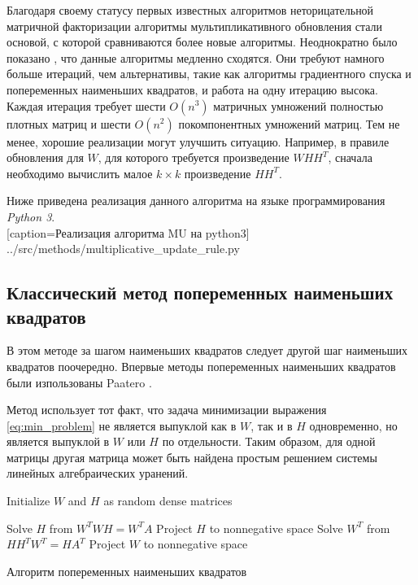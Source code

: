 Благодаря своему статусу первых известных алгоритмов неторицательной матричной факторизации
алгоритмы мультипликативного обновления стали основой,
с которой сравниваются более новые алгоритмы.
Неоднократно было показано \cite{langville}, что данные алгоритмы медленно сходятся.
Они требуют намного больше итераций, чем альтернативы, такие как алгоритмы градиентного спуска и попеременных наименьших квадратов, и работа на одну итерацию высока.
Каждая итерация требует шести $O(n^3)$ матричных умножений полностью плотных матриц и шести $O(n^2)$ покомпонентных умножений матриц.
Тем не менее, хорошие реализации могут улучшить ситуацию.
Например, в правиле обновления для $W$, для которого требуется произведение $WHH^T$, сначала необходимо вычислить малое $k \times k$ произведение $HH^T$.

\newpage

Ниже приведена реализация данного алгоритма на языке программирования \textit{Python 3}.
\\


  [caption=Реализация алгоритма MU на python3]
  {../src/methods/multiplicative_update_rule.py} \label{code:mu}



\newpage



\subsection{Классический метод попеременных наименьших квадратов}

В этом методе за шагом наименьших квадратов следует другой шаг наименьших квадратов поочередно.
Впервые методы попеременных наименьших квадратов были изпользованы Paatero \cite{paatero}.

Метод использует тот факт, что задача минимизации выражения \eqref{eq:min_problem} не является выпуклой как в $W$,
так и в $H$ одновременно, но является выпуклой в $W$ или $H$ по отдельности.
Таким образом, для одной матрицы другая матрица может быть найдена простым решением системы линейных алгебраических уранений.

\begin{algorithm} \label{alg:als_solve}

  \BlankLine
  \BlankLine


  \BlankLine

  Initialize $W$ and $H$ as random dense matrices\;

   {
    Solve $H$ from $W^TWH=W^TA$\;
    Project $H$ to nonnegative space\;
    Solve $W^T$ from $HH^TW^T=HA^T$\;
    Project $W$ to nonnegative space\;
  }

  \BlankLine

  \caption{Алгоритм попеременных наименьших квадратов}
\end{algorithm}

